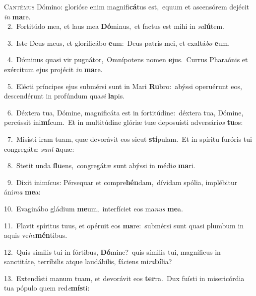 \lettrine{\initial\textcolor{\initialcolor}{C}}{antémus} Dómino: glorióse enim magnifi\-\textbf{cá}\-tus est,~\star equum et ascensórem dejécit \textit{in} \textbf{ma}\-re.\\
{\numbfont\textcolor{\numbcolor}{~2.}}~Fortitúdo mea, et laus mea \textbf{Dó}\-minus,~\star et factus est mihi in \textit{sa}\-\textbf{lú}tem.\par
{\numbfont\textcolor{\numbcolor}{~3.}}~Iste Deus meus, et glorificábo \textbf{e}\-um:~\star Deus patris mei, et exaltá\textit{bo} \textbf{e}\-um.\par
{\numbfont\textcolor{\numbcolor}{~4.}}~Dóminus quasi vir pugnátor,~\dagger Omnípotens nomen \textbf{e}\-jus.~\star Currus Pharaónis et exércitum ejus projécit \textit{in} \textbf{ma}\-re.\par
{\numbfont\textcolor{\numbcolor}{~5.}}~Elécti príncipes ejus submérsi sunt in Mari \textbf{Ru}\-bro:~\star abýssi operuérunt eos, descendérunt in profúndum qua\textit{si} \textbf{la}\-pis.\par
{\numbfont\textcolor{\numbcolor}{~6.}}~Déxtera tua, Dómine, magnificáta est in fortitúdine:~\dagger déxtera tua, Dómine, percússit ini\-\textbf{mí}\-cum.~\star Et in multitúdine glóriæ tuæ deposuísti adversári\textit{os} \textbf{tu}\-os:\par
{\numbfont\textcolor{\numbcolor}{~7.}}~Misísti iram tuam, quæ devorávit eos sicut \textbf{stí}\-pulam.~\star Et in spíritu furóris tui congregátæ \textit{sunt} \textbf{a}\-quæ:\par
{\numbfont\textcolor{\numbcolor}{~8.}}~Stetit unda \textbf{flu}\-ens,~\star congregátæ sunt abýssi in médi\textit{o} \textbf{ma}\-ri.\par
{\numbfont\textcolor{\numbcolor}{~9.}}~Dixit inimícus: Pérsequar et compre\-\textbf{hén}\-dam,~\star dívidam spólia, implébitur áni\textit{ma} \textbf{me}\-a:\par
{\numbfont\textcolor{\numbcolor}{10.}}~Evaginábo gládium \textbf{me}\-um,~\star interfíciet eos ma\textit{nus} \textbf{me}\-a.\par
{\numbfont\textcolor{\numbcolor}{11.}}~Flavit spíritus tuus, et opéruit eos \textbf{ma}\-re:~\star submérsi sunt quasi plumbum in aquis ve\-\textit{he}\-\textbf{mén}tibus.\par
{\numbfont\textcolor{\numbcolor}{12.}}~Quis símilis tui in fórtibus, \textbf{Dó}\-mine?~\star quis símilis tui, magníficus in sanctitáte, terríbilis atque laudábilis, fáciens mi\-\textit{ra}\-\textbf{bí}lia?\par
{\numbfont\textcolor{\numbcolor}{13.}}~Extendísti manum tuam, et devorávit eos \textbf{ter}\-ra.~\star Dux fuísti in misericórdia tua pópulo quem red\-\textit{e}\-\textbf{mís}ti:\par
